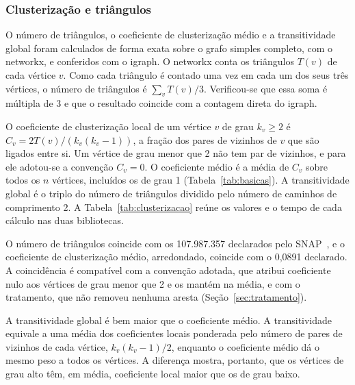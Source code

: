 \subsubsection{Clusterização e triângulos}

O número de triângulos, o coeficiente de clusterização médio e a transitividade global foram calculados de forma exata sobre o grafo simples completo, com o networkx, e conferidos com o igraph. O networkx conta os triângulos $T(v)$ de cada vértice $v$. Como cada triângulo é contado uma vez em cada um dos seus três vértices, o número de triângulos é $\sum_v T(v)/3$. Verificou-se que essa soma é múltipla de 3 e que o resultado coincide com a contagem direta do igraph.

O coeficiente de clusterização local de um vértice $v$ de grau $k_v \geq 2$ é $C_v = 2T(v)/(k_v(k_v-1))$, a fração dos pares de vizinhos de $v$ que são ligados entre si. Um vértice de grau menor que 2 não tem par de vizinhos, e para ele adotou-se a convenção $C_v = 0$. O coeficiente médio é a média de $C_v$ sobre todos os $n$ vértices, incluídos os de grau 1 (Tabela~\ref{tab:basicas}). A transitividade global é o triplo do número de triângulos dividido pelo número de caminhos de comprimento 2. A Tabela~\ref{tab:clusterizacao} reúne os valores e o tempo de cada cálculo nas duas bibliotecas.

\begin{table}[htbp]
  \centering
  \caption{Triângulos, coeficiente de clusterização médio e transitividade global do grafo simples completo, calculados de forma exata, com o tempo de cada cálculo no networkx e no igraph. Os valores coincidem nas duas bibliotecas.}
  \label{tab:clusterizacao}
  
\end{table}

O número de triângulos coincide com os 107.987.357 declarados pelo SNAP~\cite{snapnets}, e o coeficiente de clusterização médio, arredondado, coincide com o 0,0891 declarado. A coincidência é compatível com a convenção adotada, que atribui coeficiente nulo aos vértices de grau menor que 2 e os mantém na média, e com o tratamento, que não removeu nenhuma aresta (Seção~\ref{sec:tratamento}).

A transitividade global é bem maior que o coeficiente médio. A transitividade equivale a uma média dos coeficientes locais ponderada pelo número de pares de vizinhos de cada vértice, $k_v(k_v-1)/2$, enquanto o coeficiente médio dá o mesmo peso a todos os vértices. A diferença mostra, portanto, que os vértices de grau alto têm, em média, coeficiente local maior que os de grau baixo.

